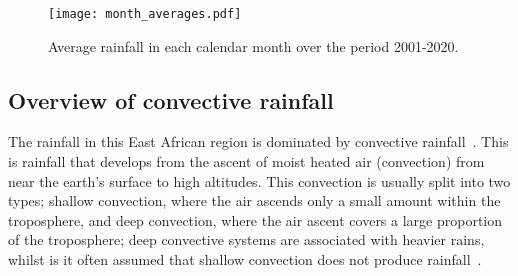 \documentclass[../main.tex]{subfiles}
\begin{document}




\begin{figure}[!ht]
     \centering
     \texttt{[image: month\_averages.pdf]}
     
     \caption{Average rainfall in each calendar month over the period 2001-2020.}
     \label{fig:monthly_rain}
\end{figure}




\subsection{Overview of convective rainfall}



The rainfall in this East African region is dominated by convective rainfall~\citep{dezfuli_precipitation_2017}. This is rainfall that develops from the ascent of moist heated air (convection) from near the earth's surface to high altitudes. This convection is usually split into two types; shallow convection, where the air ascends only a small amount within the troposphere, and deep convection, where the air ascent covers a large proportion of the troposphere; deep convective systems are associated with heavier rains, whilst is it often assumed that shallow convection does not produce rainfall~\citep{stensrud_convective_2013}. 
\end{document}
